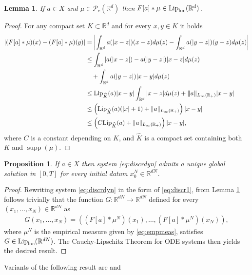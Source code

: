 \documentclass[A4paper,11pt]{article}
\newtheorem{lemma}[theorem]{Lemma}
\newtheorem{proposition}[theorem]{Proposition}
\theoremstyle{definition}
\newcommand{\Lip}{\textup{Lip}}
\newcommand{\loc}{\textup{loc}}
\newcommand{\R}{\mathbb{R}}
\DeclareMathOperator{\supp}{supp}
\begin{document}
\begin{lemma}\label{p-Fmuloclip}
If $a\in X$ and $\mu \in \mathcal{P}_c(\R^d)$ then $F[a]*\mu \in \Lip_{\loc}(\R^d)$.
\end{lemma}
\begin{proof}
For any compact set $K \subset \R^d$ and for every $x,y \in K$ it holds
\begin{align*}
|(F[a]*\mu)(x) - (F[a]*\mu)(y)| &= \left|\int_{\R^d}a(|x-z|)(x-z)d\mu(z) - \int_{\R^d}a(|y-z|)(y-z)d\mu(z)\right| \\
&\leq \int_{\R^d}|a(|x-z|)-a(|y-z|)|x-z|d\mu(z)\\
&\quad+ \int_{\R^d}a(|y-z|)|x-y|d\mu(z) \\
&\leq \Lip_{\widehat{K}}(a)|x-y| \int_{\R^d}|x-z|d\mu(z) + \|a\|_{L_{\infty}(\R_+)}|x-y| \\
&\leq \left(\Lip_{\widehat{K}}(a)(|x| + 1)+ \|a\|_{L_{\infty}(\R_+)}\right)|x-y| \\
& \leq \left(C\Lip_{\widehat{K}}(a) + \|a\|_{L_{\infty}(\R_+)} \right)|x-y|,
\end{align*}
where $C$ is a constant depending on $K$, and $\widehat{K}$ is a compact set containing both $K$ and $\supp(\mu)$.
\end{proof}



\begin{proposition}
If $a \in X$ then system \eqref{eq:discrdyn} admits a unique global solution in $[0,T]$ for every initial datum $x^{N}_0 \in \R^{dN}$.
\end{proposition}
\begin{proof}
Rewriting system \eqref{eq:discrdyn} in the form of \eqref{eq:discr1}, from Lemma \ref{p-Fmuloclip} follows trivially that the function $G:\R^{dN} \rightarrow \R^{dN}$ defined for every $(x_1, \ldots, x_N)\in \R^{dN}$ as
\begin{align*}
G(x_1, \ldots, x_N) = ((F[a]*\mu^N)(x_1),\ldots,(F[a]*\mu^N)(x_N)),
\end{align*}
where $\mu^N$ is the empirical measure given by \eqref{eq:empmeas}, satisfies $G \in \Lip_\loc(\R^{dN})$. The Cauchy-Lipschitz Theorem for ODE systems then yields the desired result.
\end{proof}

Variants of the following result are \cite[Lemma 6.7]{MFOC} and \cite[Lemma 4.7]{CanCarRos10}
\end{document}
